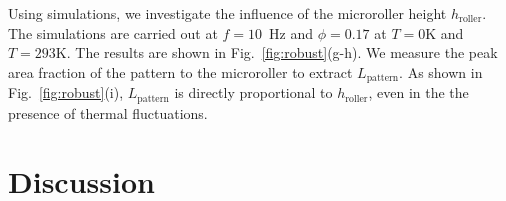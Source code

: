 \documentclass[12pt]{article}
\begin{document}
Using simulations, we investigate the influence of the microroller height $h_{\mathrm{roller}}$. 
The simulations are carried out at $f= 10$~Hz and $\phi = 0.17$ at $T=0$K and $T=293$K. The results are shown in Fig.~\ref{fig:robust}(g-h). We measure the peak area fraction of the pattern to the microroller to extract $L_{\mathrm{pattern}}$. As shown in Fig.~\ref{fig:robust}(i), $L_{\mathrm{pattern}}$ is directly proportional to $h_{\mathrm{roller}}$, even in the the presence of thermal fluctuations. 


\section*{Discussion}
\label{sec:discussion}
\end{document}
